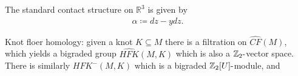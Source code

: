 \begin{example}[?]

The standard contact structure on \({\mathbb{R}}^3\) is given by
\begin{align*}
\alpha\coloneqq dz - ydz
.\end{align*}

\end{example}

Knot floer homology: given a knot \(K \subseteq M\) there is a
filtration on \(\widehat{CF}(M)\), which yields a bigraded group
\(\widehat{HFK}(M, K)\) which is also a
\({\mathbb{Z}}_2{\hbox{-}}\)vector space. There is similarly
\(HFK^-(M, K)\) which is a bigraded
\({\mathbb{Z}}_2[U] {\hbox{-}}\)module, and

\cleardoublepage

\renewcommand{\listtheoremname}{}
\listoftheorems[ignoreall,show={definition}, numwidth=3.5em]
\cleardoublepage

\renewcommand{\listtheoremname}{}
\listoftheorems[ignoreall,show={theorem,proposition}, numwidth=3.5em]
\cleardoublepage

\renewcommand{\listtheoremname}{}
\listoftheorems[ignoreall,show={exercise}, numwidth=3.5em]
\cleardoublepage

\listoffigures
\cleardoublepage


\printbibliography[title=Bibliography]



